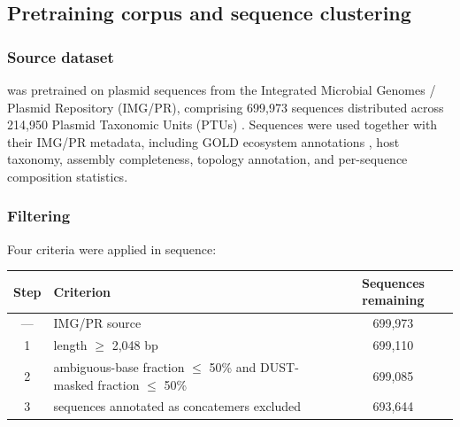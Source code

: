 %
%

\subsection*{Pretraining corpus and sequence clustering}

\subsubsection*{Source dataset}

\model was pretrained on plasmid sequences from the Integrated Microbial
Genomes / Plasmid Repository (IMG/PR), \cite{camargo2024img} comprising
699,973 sequences distributed across 214,950 Plasmid Taxonomic Units
(PTUs) \cite{redondosalvo2020pathways}. Sequences were used together with
their IMG/PR metadata, including GOLD ecosystem annotations
\cite{mukherjee2023twenty}, host taxonomy, assembly completeness, topology
annotation, and per-sequence composition statistics.

\subsubsection*{Filtering}

Four criteria were applied in sequence:

\begin{center}
\small
\begin{tabular}{clc}
\toprule
Step & Criterion & Sequences remaining \\
\midrule
--- & IMG/PR source & 699,973 \\
1 & length $\geq$ 2,048 bp & 699,110 \\
2 & ambiguous-base fraction $\leq$ 50\% and DUST-masked fraction $\leq$ 50\% & 699,085 \\
3 & sequences annotated as concatemers excluded & 693,644 \\
\bottomrule
\end{tabular}
\end{center}

